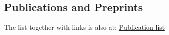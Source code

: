 \documentclass[overlapped,line,letterpaper]{res}
\begin{document}
\begin{resume}
\section {\sc Publications and Preprints} 
The list together with links is also at:
   \href{http://yashamon.github.io/web2/}{Publication list} 

\end{resume}
\end{document}
